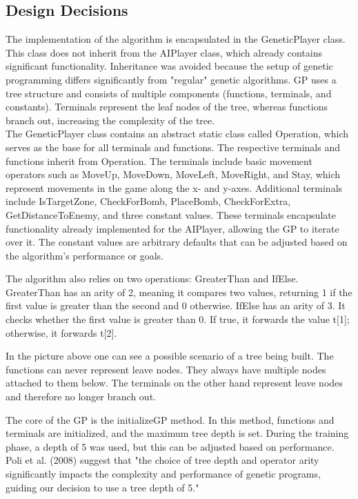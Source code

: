 \documentclass[sigconf]{acmart} %
\begin{document}
\subsection{Design Decisions}

The implementation of the algorithm is encapsulated in the GeneticPlayer class. This class does not inherit from the AIPlayer class, which already contains significant functionality. Inheritance was avoided because the setup of genetic programming differs significantly from "regular" genetic algorithms. GP uses a tree structure and consists of multiple components (functions, terminals, and constants). Terminals represent the leaf nodes of the tree, whereas functions branch out, increasing the complexity of the tree. \\ 
The GeneticPlayer class contains an abstract static class called Operation, which serves as the base for all terminals and functions. The respective terminals and functions inherit from Operation. The terminals include basic movement operators such as MoveUp, MoveDown, MoveLeft, MoveRight, and Stay, which represent movements in the game along the x- and y-axes. Additional terminals include IsTargetZone, CheckForBomb, PlaceBomb, CheckForExtra, GetDistanceToEnemy, and three constant values. These terminals encapsulate functionality already implemented for the AIPlayer, allowing the GP to iterate over it. The constant values are arbitrary defaults that can be adjusted based on the algorithm's performance or goals.

The algorithm also relies on two operations: GreaterThan and IfElse. GreaterThan has an arity of 2, meaning it compares two values, returning 1 if the first value is greater than the second and 0 otherwise. IfElse has an arity of 3. It checks whether the first value is greater than 0. If true, it forwards the value t[1]; otherwise, it forwards t[2].


In the picture above one can see a possible scenario of a tree being built. The functions can never represent leave nodes. They always have multiple nodes attached to them below. The terminals on the other hand represent leave nodes and therefore no longer branch out. 

The core of the GP is the initializeGP method. In this method, functions and terminals are initialized, and the maximum tree depth is set. During the training phase, a depth of 5 was used, but this can be adjusted based on performance. Poli et al. (2008) suggest that \cite{poli2008fieldguide} "the choice of tree depth and operator arity significantly impacts the complexity and performance of genetic programs, guiding our decision to use a tree depth of 5." 
\end{document}
